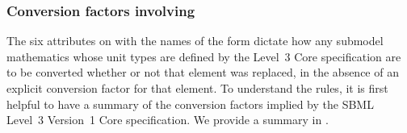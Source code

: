 

\subsubsection{Conversion factors involving }

The six attributes on \Submodel with the names of the form
 dictate how any submodel
mathematics whose unit types are defined by the Level~3 Core
specification are to be converted whether or not that element was
replaced, in the absence of an explicit conversion factor for that
element.  To understand the rules, it is first helpful to have a summary
of the conversion factors implied by the SBML Level~3 Version~1 Core
specification.  We provide a summary in .

\newcommand{\sprd}[2]{\raisebox{-#1pt}[0pt][(#1pt * 2) + 4pt]{#2}}
\newcommand{\persymb}{\emph{Conversion factor for referenced object}}
\newcommand{\percomp}{\emph{Conversion factor for compartment}}
\newcommand{\allat}{\emph{(All)}}
\newcommand{\hosu}{\token{hasOnlySubstanceUnits}}

